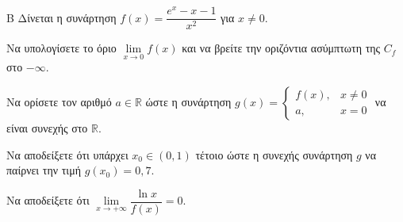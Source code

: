 \begin{thema}{Β}
Δίνεται η συνάρτηση $f(x) = \dfrac{e^x - x - 1}{x^2}$ για $x \ne 0$.
\begin{erwthma}
\item Να υπολογίσετε το όριο $\lim\limits_{x \to 0} f(x)$ και να βρείτε την οριζόντια ασύμπτωτη της $C_f$ στο $-\infty$.
\item Να ορίσετε τον αριθμό $a \in \mathbb{R}$ ώστε η συνάρτηση $g(x) = \begin{cases} f(x), & x \ne 0 \\ a, & x = 0 \end{cases}$ να είναι συνεχής στο $\mathbb{R}$.
\item Να αποδείξετε ότι υπάρχει $x_0 \in (0, 1)$ τέτοιο ώστε η συνεχής συνάρτηση $g$ να παίρνει την τιμή $g(x_0) = 0,7$.
\item Να αποδείξετε ότι $\lim\limits_{x \to +\infty} \dfrac{\ln x}{f(x)} = 0$.
\end{erwthma}
\end{thema}
